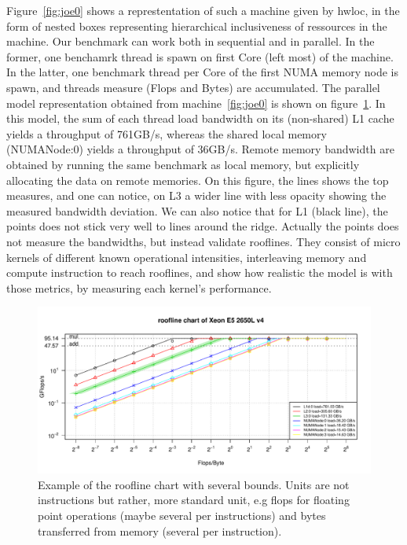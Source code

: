 \documentclass[runningheads,a4paper]{llncs}
\begin{document}
Figure~\ref{fig:joe0} shows a represtentation of such a machine given by hwloc, in the form of nested boxes representing
hierarchical inclusiveness of ressources in the machine. Our benchmark can work both in sequential and in parallel. In the former,
one benchamrk thread is spawn on first Core (left most) of the machine. In the latter, one benchmark thread per Core of the first
NUMA memory node is spawn, and threads measure (Flops and Bytes) are accumulated. The parallel model representation obtained from
machine~\ref{fig:joe0} is shown on figure~\ref{fig:orig_model}. In this model, the sum of each thread load bandwidth on its (non-shared)
 L1 cache yields a throughput of 761GB/s, whereas the shared local memory (NUMANode:0) yields a throughput of 36GB/s.
Remote memory bandwidth are obtained by running the same benchmark as local memory, but explicitly allocating the data on remote
 memories.
On this figure, the lines shows the top measures, and one can notice, on L3 a wider line with less opacity showing the measured
bandwidth deviation.
We can also notice that for L1 (black line), the points does not stick very well to lines around the ridge. Actually the points
does not measure the bandwidths, but instead validate rooflines. They consist of micro kernels of different known operational
intensities, interleaving memory and compute instruction to reach rooflines, and show how realistic the model is with those
metrics, by measuring each kernel's performance.

\begin{figure}
  \centering
  \includegraphics[width=\textwidth]{pictures/roofline_model}
  \caption{Example of the roofline chart with several bounds. Units are not instructions but rather, more standard unit, e.g flops for floating point operations (maybe several per instructions) and bytes transferred from memory (several per instruction).}
  \label{fig:orig_model}
\end{figure}
\end{document}
